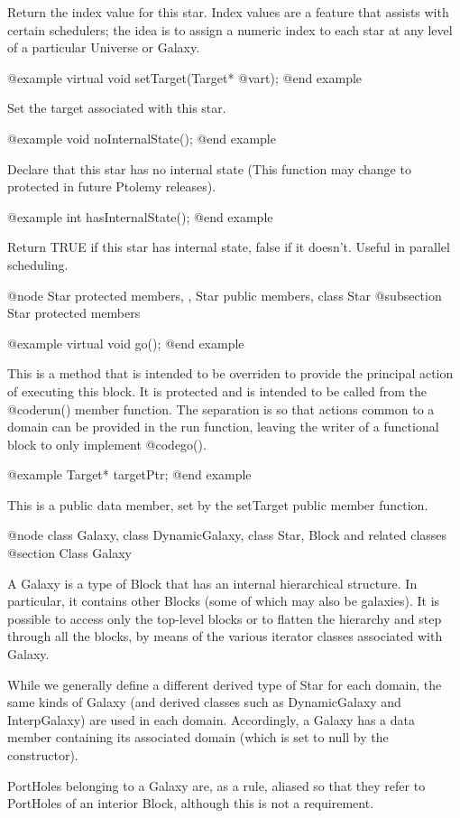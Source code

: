 Return the index value for this star.  Index values are a feature
that assists with certain schedulers; the idea is to assign a numeric
index to each star at any level of a particular Universe or Galaxy.

@example
virtual void setTarget(Target* @var{t});
@end example

Set the target associated with this star.

@example
void noInternalState();
@end example

Declare that this star has no internal state (This function may
change to protected in future Ptolemy releases).

@example
int hasInternalState();
@end example

Return TRUE if this star has internal state, false if it doesn't.
Useful in parallel scheduling.

@node Star protected members,  , Star public members, class Star
@subsection Star protected members

@example
virtual void go();
@end example

This is a method that is intended to be overriden to provide the
principal action of executing this block.  It is protected and is
intended to be called from the @code{run()} member function.  The
separation is so that actions common to a domain can be provided
in the run function, leaving the writer of a functional block to
only implement @code{go()}.

@example
Target* targetPtr;
@end example

This is a public data member, set by the setTarget public member
function.

@node class Galaxy, class DynamicGalaxy, class Star, Block and related classes
@section Class Galaxy

A Galaxy is a type of Block that has an internal hierarchical structure.
In particular, it contains other Blocks (some of which may also be
galaxies).  It is possible to access only the top-level blocks or to
flatten the hierarchy and step through all the blocks, by means
of the various iterator classes associated with Galaxy.

While we generally define a different derived type of Star for each
domain, the same kinds of Galaxy (and derived classes such as
DynamicGalaxy and InterpGalaxy) are used in each domain.  Accordingly,
a Galaxy has a data member containing its associated domain (which
is set to null by the constructor).

PortHoles belonging to a Galaxy are, as a rule, aliased so that they
refer to PortHoles of an interior Block, although this is not a
requirement.

